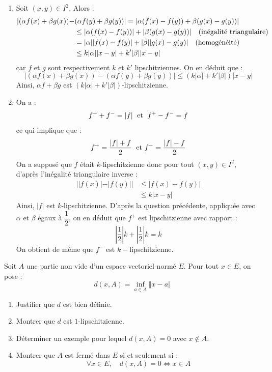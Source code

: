 \documentclass[a4paper,twoside,french,11pt]{VcCours}
\begin{document}
\begin{enumerate}
\item Soit $(x,y) \in I^2$. Alors :
\begin{align*}
\vert (\alpha f(x)+ \beta g(x))-&(\alpha f(y)+ \beta g(y)) \vert = \vert \alpha (f(x)-f(y)) + \beta (g(x)-g(y)) \vert \\
& \leq \vert \alpha (f(x)-f(y)) \vert + \vert \beta (g(x)-g(y)) \vert \quad \hbox{(inégalité triangulaire)} \\
& = \vert \alpha \vert \vert f(x)-f(y) \vert + \vert \beta \vert \vert g(x)-g(y) \vert \quad \hbox{(homogénéité)} \\
& \leq k \vert \alpha \vert  \vert x-y \vert + k' \vert \beta \vert \vert x-y \vert 
\end{align*}
car $f$ et $g$ sont respectivement $k$ et $k'$ lipschitziennes. On en déduit que :
$$ \vert (\alpha f(x)+ \beta g(x))-(\alpha f(y)+ \beta g(y)) \vert \leq (k \vert \alpha \vert + k' \vert \beta \vert) \vert x-y \vert$$
Ainsi, $\alpha f+ \beta g$ est $(k \vert \alpha \vert + k' \vert \beta \vert)$-lipschitzienne.
\item On a :
$$ f^{+} + f^{-} = \vert f \vert \; \hbox{ et } \; f^{+}-f^{-} = f$$
ce qui implique que :
$$ f^{+} = \dfrac{\vert f \vert+f}{2} \; \hbox{ et } f^{-}=\dfrac{\vert f \vert - f}{2}$$
On a supposé que $f$ était $k$-lipschitzienne donc pour tout $(x,y) \in I^2$, d'après l'inégalité triangulaire \og inverse \fg :
\begin{align*}
\vert \vert f(x) \vert - \vert f(y) \vert \vert & \leq \vert f(x)-f(y) \vert  \\
& \leq k \vert x-y \vert
\end{align*}
Ainsi, $\vert f \vert$ est $k$-lipschitzienne. D'après la question précédente, appliquée avec $\alpha$ et $\beta$ égaux à $\dfrac{1}{2}$, on en déduit que $f^{+}$ est lipschitzienne avec rapport :
$$ \left\vert \dfrac{1}{2} \right\vert k + \left\vert \dfrac{1}{2} \right\vert k = k$$
On obtient de même que $f^{-}$ est $k-$lipschitzienne.
\end{enumerate}








\begin{Exercice}[$\bigstar$]{} Soit $A$ une partie non vide d'un espace vectoriel normé $E$. Pour tout $x \in E$, on pose :
$$d(x,A) = \inf_{a \in A} \Vert x- a \Vert$$

\begin{enumerate}
\item Justifier que $d$ est bien définie.
\item Montrer que $d$ est $1$-lipschitzienne.
\item Déterminer un exemple pour lequel $d(x,A)=0$ avec $x \notin A$.
\item Montrer que $A$ est fermé dans $E$ si et seulement si :
$$ \forall x \in E, \quad d(x,A)=0 \Longleftrightarrow x \in A $$
\end{enumerate}
\end{Exercice}
\end{document}
